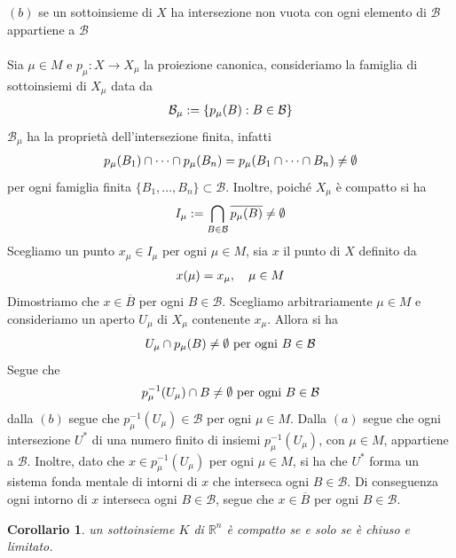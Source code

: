 \documentclass[oneside, 11pt]{amsbook}
\makeatletter
\newcommand{\0}{{(0)}}
\newcommand{\3}{{(3)}}
\theoremstyle{colonplain}
\newtheorem{cor}[thm]{Corollario}
\theoremstyle{colondefinition}
\theoremstyle{colonremark}
\numberwithin{equation}{chapter}
\renewcommand{\proofname}{Dimostrazione}
\renewenvironment{proof}[1][\proofname]{\par
  \pushQED{\qed}%
  \normalfont \topsep6\p@\@plus6\p@\relax
  \trivlist
  \item[\hskip\labelsep\bfseries #1:]\ignorespaces
}{%
  \popQED\endtrivlist\@endpefalse
}
\makeatother
\begin{document}
\begin{proof}
$(b)$ se un sottoinsieme di $X$ ha intersezione non vuota con ogni elemento di $\mathcal{B}$ appartiene a $\mathcal{B}$ \\ \\
Sia $\mu \in M$ e $p_\mu : X \longrightarrow X_\mu$ la proiezione canonica, consideriamo la famiglia di sottoinsiemi di $X_\mu$ data da
\begin{align}
    \mathcal{B}_\mu := \{ p_\mu(B) : B \in \mathcal{B} \} \notag
\end{align}
$\mathcal{B}_\mu$ ha la proprietà dell'intersezione finita, infatti
\begin{align}
    p_\mu(B_1) \cap \dots \cap p_\mu(B_n) = p_\mu(B_1 \cap \dots \cap B_n) \neq \emptyset \notag
\end{align}
per ogni famiglia finita $\{ B_1, \dots, B_n \} \subset \mathcal{B}$. Inoltre, poiché $X_\mu$ è compatto si ha
\begin{align}
    I_\mu := \bigcap_{B \in \mathcal{B}} \overline{p_\mu(B)} \neq \emptyset \notag
\end{align}
Scegliamo un punto $x_\mu \in I_\mu$ per ogni $\mu \in M$, sia $x$ il punto di $X$ definito da
\begin{align}
    x(\mu) = x_\mu, \quad \mu \in M \notag
\end{align}
Dimostriamo che $x \in \overline{B}$ per ogni $B \in \mathcal{B}$. Scegliamo arbitrariamente $\mu \in M$ e consideriamo un aperto $U_\mu$ di $X_\mu$ contenente $x_\mu$. Allora si ha
\begin{align}
    U_\mu \cap p_\mu(B) \neq \emptyset \text{ per ogni } B \in \mathcal{B} \notag
\end{align}
Segue che
\begin{align}
    p_\mu^{-1}(U_\mu) \cap B \neq \emptyset \text{ per ogni } B \in \mathcal{B} \notag
\end{align}
dalla $(b)$ segue che $p_\mu^{-1}(U_\mu) \in \mathcal{B}$ per ogni $\mu \in M$. Dalla $(a)$ segue che ogni intersezione $U^*$ di una numero finito di insiemi $p_\mu^{-1}(U_\mu)$, con $\mu \in M$, appartiene a $\mathcal{B}$. Inoltre, dato che $x \in p_\mu^{-1}(U_\mu)$ per ogni $\mu \in M$, si ha che $U^*$ forma un sistema fonda
mentale di intorni di $x$ che interseca ogni $B \in \mathcal{B}$. Di conseguenza ogni intorno di $x$ interseca ogni $B \in \mathcal{B}$, segue che $x \in \overline{B}$ per ogni $B \in \mathcal{B}$.\end{proof}
\begin{cor}\label{CompactRn}
un sottoinsieme $K$ di $\mathbb{R}^n$ è compatto se e solo se è chiuso e limitato.
\end{cor}
\end{document}

